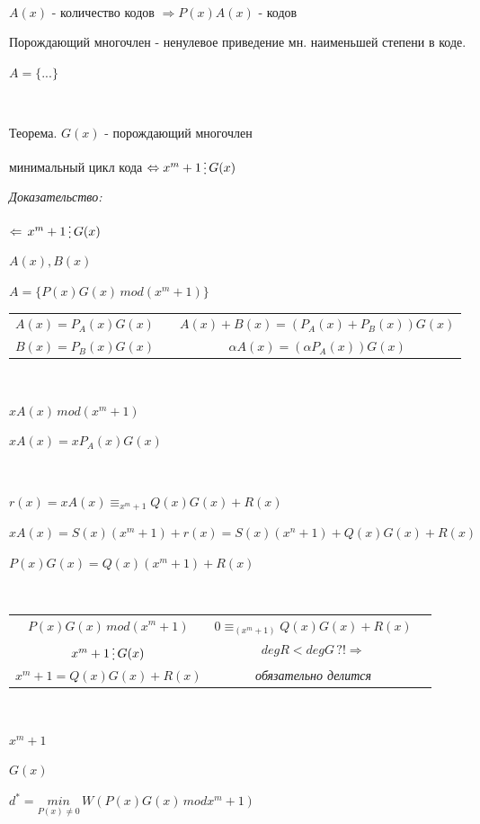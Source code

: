 \documentclass[12pt]{article}
\begin{document}
    $ $\par
    $A(x)$ - количество кодов $\Rightarrow P(x)A(x)$ - кодов\par
    Порождающий многочлен - ненулевое приведение мн. наименьшей степени в коде.\par
    $A = \{ ... \}$\par
    $ $\par
    Теорема. $G(x)$ - порождающий многочлен\par
    минимальный цикл кода $\Leftrightarrow x^m + 1 \mathop{\raisebox{-2pt}{\vdots}} G(x)$\par
    \textit{Доказательство:}\par
    $\Leftarrow \, x^m+1 \mathop{\raisebox{-2pt}{\vdots}} G(x)$\par
    $A(x),B(x)$\par
    $A=\{ P(x)G(x) \, mod(x^m +1 )\}$\par
    \begin{tabular}{ccc}
        $A(x) = P_A(x)G(x)$ & & $A(x)+B(x) = (P_A(x)+P_B(x))G(x)$\\
        $B(x) = P_B(x)G(x)$ & & $\alpha A(x) = (\alpha P_A(x))G(x)$\\
    \end{tabular}\par
    $ $\par
    $xA(x) \, mod(x^m+1)$\par
    $xA(x) = xP_A(x)G(x)$\par
    $ $\par
    $r(x) = xA(x) \equiv _{x^m+1} Q(x)G(x)+R(x)$\par
    $xA(x) = S(x)(x^m+1)+r(x)=S(x)(x^n+1)+Q(x)G(x)+R(x)$\par
    $P(x)G(x)=Q(x)(x^m+1)+R(x)$\par
    $ $\par
    \begin{tabular}{ccc}
        $P(x)G(x) \, mod(x^m+1)$ & $0 \equiv _{(x^m+1)}Q(x)G(x)+R(x)$ \\
        $x^m+1 \mathop{\raisebox{-2pt}{\vdots}} G(x)$ & $degR < deg G \, ?! \Rightarrow$ \\
        $x^m+1 = Q(x)G(x)+R(x)$ & \textit{обязательно делится}\\
    \end{tabular}\par
    $ $\par
    $x^m+1$\par
    $G(x)$\par
    $d^* = \overset{}{\underset{P(x) \neq 0}{min}} \, W(P(x)G(x) \, mod x^m+1)$\par
\end{document}
